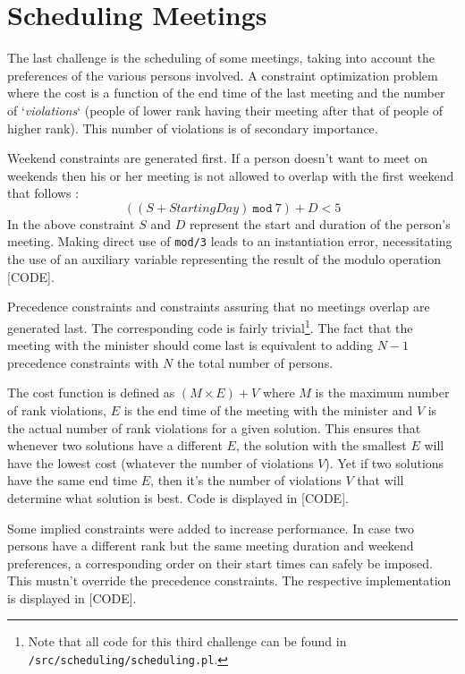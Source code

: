 \section{Scheduling Meetings}

The last challenge is the scheduling of some meetings, taking into account the preferences of the various persons involved. A constraint optimization problem where the cost is a function of the end time of the last meeting and the number of `\textit{violations}` (people of lower rank having their meeting after that of people of higher rank). This number of violations is of secondary importance.\\\par

Weekend constraints are generated first. If a person doesn't want to meet on weekends then his or her meeting is not allowed to overlap with the first weekend that follows :
$$((S + \textit{StartingDay})\ \texttt{mod}\ 7) + D <  5$$
In the above constraint $S$ and $D$ represent the start and duration of the person's meeting. Making direct use of \texttt{mod/3} leads to an instantiation error, necessitating the use of an auxiliary variable representing the result of the modulo operation [CODE].\par
Precedence constraints and constraints assuring that no meetings overlap are generated last. The corresponding code is fairly trivial\footnote{Note that all code for this third challenge can be found in \texttt{/src/scheduling/scheduling.pl}.}. The fact that the meeting with the minister should come last is equivalent to adding $N-1$ precedence constraints with $N$ the total number of persons. \\\par
The cost function is defined as $(M\times E)+V$ where $M$ is the maximum number of rank violations, $E$ is the end time of the meeting with the minister and $V$ is the actual number of rank violations for a given solution. This ensures that whenever two solutions have a different $E$, the solution with the smallest $E$ will have the lowest cost (whatever the number of violations $V$). Yet if two solutions have the same end time $E$, then it's the number of violations $V$ that will determine what solution is best. Code is displayed in [CODE]. \\\par

Some implied constraints were added to increase performance. In case two persons have a different rank but the same meeting duration and weekend preferences, a corresponding order on their start times can safely be imposed. This mustn't override the precedence constraints. The respective implementation is displayed in [CODE].\\\par


